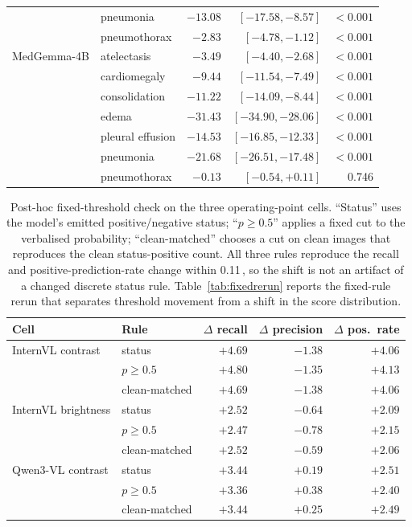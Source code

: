 \begin{table}[H]
\begin{tabular}{llrrr}
 & pneumonia & $-13.08$ & $[-17.58,-8.57]$ & $<0.001$ \\
 & pneumothorax & $-2.83$ & $[-4.78,-1.12]$ & $<0.001$ \\
\midrule
MedGemma-4B & atelectasis & $-3.49$ & $[-4.40,-2.68]$ & $<0.001$ \\
 & cardiomegaly & $-9.44$ & $[-11.54,-7.49]$ & $<0.001$ \\
 & consolidation & $-11.22$ & $[-14.09,-8.44]$ & $<0.001$ \\
 & edema & $-31.43$ & $[-34.90,-28.06]$ & $<0.001$ \\
 & pleural effusion & $-14.53$ & $[-16.85,-12.33]$ & $<0.001$ \\
 & pneumonia & $-21.68$ & $[-26.51,-17.48]$ & $<0.001$ \\
 & pneumothorax & $-0.13$ & $[-0.54,+0.11]$ & 0.746 \\
\bottomrule
\end{tabular}
\end{table}

\begin{table}[H]
\centering
\small
\caption{Post-hoc fixed-threshold check on the three operating-point cells. ``Status'' uses the model's emitted positive/negative status; ``$p\ge0.5$'' applies a fixed cut to the verbalised probability; ``clean-matched'' chooses a cut on clean images that reproduces the clean status-positive count. All three rules reproduce the recall and positive-prediction-rate change within 0.11\,\pp{}, so the shift is not an artifact of a changed discrete status rule. Table~\ref{tab:fixedrerun} reports the fixed-rule rerun that separates threshold movement from a shift in the score distribution.}
\label{tab:fixedthr}
\begin{tabular}{llrrr}
\toprule
Cell & Rule & $\Delta$ recall & $\Delta$ precision & $\Delta$ pos.\ rate \\
\midrule
InternVL contrast & status & $+4.69$ & $-1.38$ & $+4.06$ \\
 & $p\ge0.5$ & $+4.80$ & $-1.35$ & $+4.13$ \\
 & clean-matched & $+4.69$ & $-1.38$ & $+4.06$ \\
\midrule
InternVL brightness & status & $+2.52$ & $-0.64$ & $+2.09$ \\
 & $p\ge0.5$ & $+2.47$ & $-0.78$ & $+2.15$ \\
 & clean-matched & $+2.52$ & $-0.59$ & $+2.06$ \\
\midrule
Qwen3-VL contrast & status & $+3.44$ & $+0.19$ & $+2.51$ \\
 & $p\ge0.5$ & $+3.36$ & $+0.38$ & $+2.40$ \\
 & clean-matched & $+3.44$ & $+0.25$ & $+2.49$ \\
\bottomrule
\end{tabular}
\end{table}

